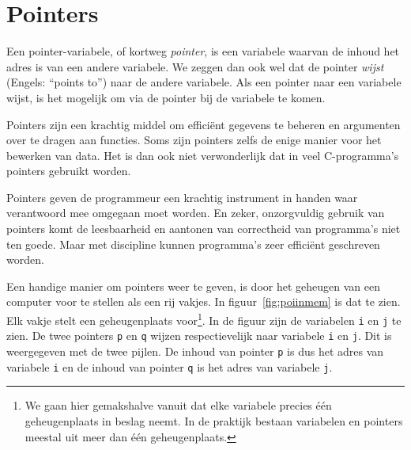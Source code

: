 \chapter{Pointers}
\label{cha:pointers}
\thispagestyle{empty}

Een pointer-variabele, of kortweg \textsl{pointer}, is een variabele waarvan de inhoud het adres is van een andere variabele. We zeggen dan ook wel dat de pointer \textsl{wijst} (Engels: ``points to'') naar de andere variabele. Als een pointer naar een variabele wijst, is het mogelijk om via de pointer bij de variabele te komen.

Pointers zijn een krachtig middel om efficiënt gegevens te beheren en argumenten over te dragen aan functies. Soms zijn pointers zelfs de enige manier voor het bewerken van data. Het is dan ook niet verwonderlijk dat in veel C-programma's pointers gebruikt worden. 


Pointers geven de programmeur een krachtig instrument in handen waar verantwoord mee omgegaan moet worden.
En zeker, onzorgvuldig gebruik van pointers komt de leesbaarheid en aantonen van correctheid van programma's niet ten goede. Maar met discipline kunnen programma's zeer efficiënt geschreven worden.

Een handige manier om pointers weer te geven, is door het geheugen van een computer voor te stellen als een rij vakjes. In figuur~\ref{fig:poiinmem} is dat te zien. Elk vakje stelt een geheugenplaats voor\footnote{We gaan hier gemakshalve vanuit dat elke variabele precies één geheugenplaats in beslag neemt. In de praktijk bestaan variabelen en pointers meestal uit meer dan één geheugenplaats.}. In de figuur zijn de variabelen \texttt{i} en \texttt{j} te zien. De twee pointers \texttt{p} en \texttt{q} wijzen respectievelijk naar variabele \texttt{i} en \texttt{j}. Dit is weergegeven met de twee pijlen. De inhoud van pointer \texttt{p} is dus het adres van variabele \texttt{i} en de inhoud van pointer \texttt{q} is het adres van variabele \texttt{j}.

